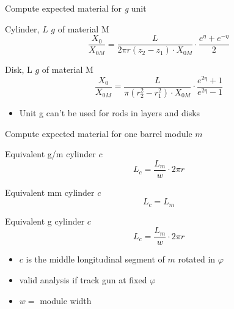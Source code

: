 \documentclass[pdftex, 11pt]{beamer}
\begin{document}
\begin{frame}{Compute expected material for \emph{g} unit}
  \begin{block}{Cylinder, \alert{$L$} $g$ of material \alert{M}}
    $$
    \frac{X_0}{X_{0M}} = \frac{L}{2\pi r (z_2-z_1) \cdot X_{0M}} \cdot \frac{e^\eta+e^{-\eta}}{2}
    $$
  \end{block}
  \begin{block}{Disk, \alert{L} $g$ of material \alert{M}}
    $$
    \frac{X_0}{X_{0M}} = \frac{L}{\pi(r_2^2-r_1^2)\cdot X_{0M}}\cdot\frac{e^{2\eta}+1}{e^{2\eta}-1}
    $$
  \end{block}
  \begin{itemize}
  \item Unit \alert{g} can't be used for rods in layers and disks
  \end{itemize}
\end{frame}

\begin{frame}{Compute expected material for one barrel module \alert{$m$}}
  \begin{block}{Equivalent \alert{g/m} cylinder \alert{$c$}}
    $$
    L_c = \frac{L_m}{w}\cdot 2\pi r
    $$
  \end{block}

  \begin{block}{Equivalent \alert{mm} cylinder \alert{$c$}}
    $$
    L_c = L_m
    $$
  \end{block}

  \begin{block}{Equivalent \alert{g} cylinder \alert{$c$}}
    $$
    L_c = \frac{L_m}{w}\cdot 2\pi r
    $$
  \end{block}

  \begin{itemize}
  \item $c$ is the middle longitudinal segment of $m$ rotated in $\varphi$
  \item valid analysis if track gun at fixed $\varphi$
  \item $w = $ module width
  \end{itemize}
\end{frame}
\end{document}
